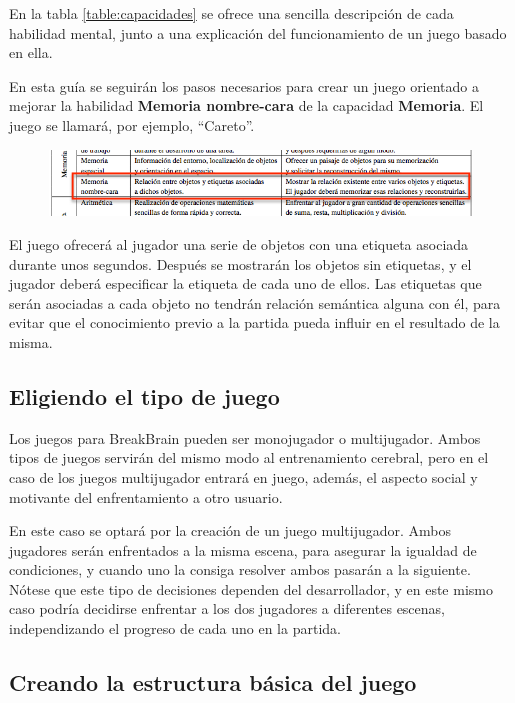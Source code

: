 En la tabla \ref{table:capacidades} se ofrece una sencilla descripción de cada habilidad mental, junto a una explicación del funcionamiento de un juego basado en ella.

En esta guía se seguirán los pasos necesarios para crear un juego orientado a mejorar la habilidad {\bf Memoria nombre-cara} de la capacidad {\bf Memoria}. El juego se llamará, por ejemplo, ``Careto''.

\begin{figure}[H]
  \begin{center}
    \includegraphics[width=1\textwidth]{images/captura-nombre-cara.png}
  \end{center}
\end{figure}

El juego ofrecerá al jugador una serie de objetos con una etiqueta asociada durante unos segundos. Después se mostrarán los objetos sin etiquetas, y el jugador deberá especificar la etiqueta de cada uno de ellos. Las etiquetas que serán asociadas a cada objeto no tendrán relación semántica alguna con él, para evitar que el conocimiento previo a la partida pueda influir en el resultado de la misma.

\subsection{Eligiendo el tipo de juego}

Los juegos para BreakBrain pueden ser monojugador o multijugador. Ambos tipos de juegos servirán del mismo modo al entrenamiento cerebral, pero en el caso de los juegos multijugador entrará en juego, además, el aspecto social y motivante del enfrentamiento a otro usuario.

En este caso se optará por la creación de un juego multijugador. Ambos jugadores serán enfrentados a la misma escena, para asegurar la igualdad de condiciones, y cuando uno la consiga resolver ambos pasarán a la siguiente. Nótese que este tipo de decisiones dependen del desarrollador, y en este mismo caso podría decidirse enfrentar a los dos jugadores a diferentes escenas, independizando el progreso de cada uno en la partida.

\subsection{Creando la estructura básica del juego}

